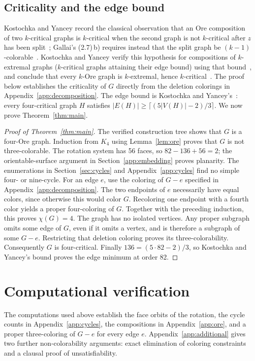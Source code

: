 \documentclass[11pt]{article}
\begin{document}
\subsection{Criticality and the edge bound}\label{sec:crit}
Kostochka and Yancey record the classical observation that an Ore
composition of two $k$-critical graphs is $k$-critical when the second
graph is not $k$-critical after $z$ has been
split~\cite[Section~1]{ky}; Gallai's (2.7)\,b) requires instead that the
split graph be $(k-1)$-colorable~\cite[Section~2]{gallai}. Kostochka and
Yancey verify this hypothesis for compositions of $k$-extremal graphs
($k$-critical graphs attaining their edge bound) using that
bound~\cite[Theorem~4]{ky}, and conclude that every $k$-Ore graph is
$k$-extremal, hence $k$-critical~\cite[Section~1, paragraphs before
Theorem~6]{ky}. The proof below establishes the criticality of $G$
directly from the deletion colorings in Appendix~\ref{app:decomposition}.
The edge bound is Kostochka and Yancey's~\cite[Theorem~3]{kybound}: every
four-critical graph $H$ satisfies
$|E(H)|\geq\lceil(5|V(H)|-2)/3\rceil$. We now prove
Theorem~\ref{thm:main}.
\begin{proof}[Proof of Theorem~\ref{thm:main}]
The verified construction tree shows that $G$ is a four-Ore graph.
Induction from $K_4$ using Lemma~\ref{lem:ore} proves that $G$ is not
three-colorable. The rotation system has 56 faces,
so $82-136+56=2$; the orientable-surface argument in
Section~\ref{app:embedding} proves planarity. The enumerations in
Section~\ref{sec:cycles} and Appendix~\ref{app:cycles} find no simple four- or nine-cycle.
For an edge $e$, use the coloring of $G-e$ specified in
Appendix~\ref{app:decomposition}. The two endpoints of
$e$ necessarily have equal colors, since otherwise this would color
$G$. Recoloring one endpoint with a fourth color yields a proper
four-coloring of $G$. Together with the preceding induction, this proves
$\chi(G)=4$. The graph has no isolated vertices. Any proper subgraph
omits some edge of $G$, even if it omits a vertex, and is therefore a
subgraph of some $G-e$. Restricting that deletion coloring proves its
three-colorability. Consequently $G$ is four-critical.
Finally $136=(5\cdot82-2)/3$, so Kostochka and Yancey's bound proves the
edge minimum at order 82.
\end{proof}

\section{Computational verification}\label{sec:checks}
The computations used above establish the face orbits of the rotation,
the cycle counts in Appendix~\ref{app:cycles}, the compositions in
Appendix~\ref{app:ore}, and a proper three-coloring of $G-e$ for every edge
$e$. Appendix~\ref{app:additional} gives two further non-colorability arguments:
exact elimination of coloring constraints and a clausal proof of
unsatisfiability.
\end{document}
